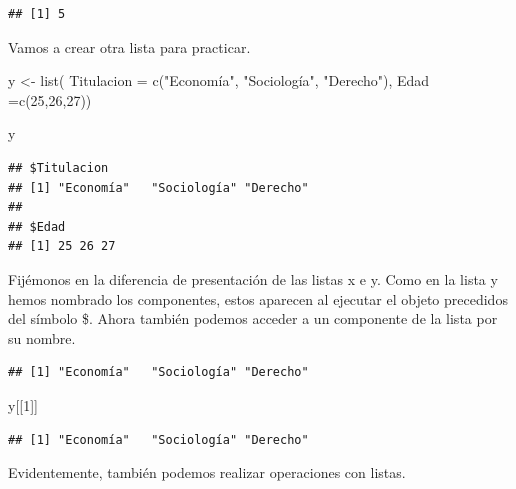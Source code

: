 \documentclass[
]{book}
\newenvironment{Shaded}{\begin{snugshade}}{\end{snugshade}}
\newcommand{\AttributeTok}[1]{\textcolor[rgb]{0.77,0.63,0.00}{#1}}
\newcommand{\DecValTok}[1]{\textcolor[rgb]{0.00,0.00,0.81}{#1}}
\newcommand{\FunctionTok}[1]{\textcolor[rgb]{0.00,0.00,0.00}{#1}}
\newcommand{\NormalTok}[1]{#1}
\newcommand{\OtherTok}[1]{\textcolor[rgb]{0.56,0.35,0.01}{#1}}
\newcommand{\SpecialCharTok}[1]{\textcolor[rgb]{0.00,0.00,0.00}{#1}}
\newcommand{\StringTok}[1]{\textcolor[rgb]{0.31,0.60,0.02}{#1}}
\begin{document}
\begin{verbatim}
## [1] 5
\end{verbatim}

Vamos a crear otra lista para practicar.

\begin{Shaded}
\begin{Highlighting}[]
\NormalTok{y }\OtherTok{\textless{}{-}} \FunctionTok{list}\NormalTok{( }\AttributeTok{Titulacion =} \FunctionTok{c}\NormalTok{(}\StringTok{"Economía"}\NormalTok{, }\StringTok{"Sociología"}\NormalTok{, }\StringTok{"Derecho"}\NormalTok{), }\AttributeTok{Edad =}\FunctionTok{c}\NormalTok{(}\DecValTok{25}\NormalTok{,}\DecValTok{26}\NormalTok{,}\DecValTok{27}\NormalTok{))}

\NormalTok{y}
\end{Highlighting}
\end{Shaded}

\begin{verbatim}
## $Titulacion
## [1] "Economía"   "Sociología" "Derecho"   
## 
## $Edad
## [1] 25 26 27
\end{verbatim}

Fijémonos en la diferencia de presentación de las listas x e y. Como en la lista y hemos nombrado los componentes, estos aparecen al ejecutar el objeto precedidos del símbolo \$. Ahora también podemos acceder a un componente de la lista por su nombre.

\begin{Shaded}
\end{Shaded}

\begin{verbatim}
## [1] "Economía"   "Sociología" "Derecho"
\end{verbatim}

\begin{Shaded}
\begin{Highlighting}[]
\NormalTok{y[[}\DecValTok{1}\NormalTok{]]}
\end{Highlighting}
\end{Shaded}

\begin{verbatim}
## [1] "Economía"   "Sociología" "Derecho"
\end{verbatim}

Evidentemente, también podemos realizar operaciones con listas.
\end{document}
